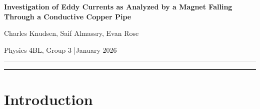 \documentclass[11pt]{article}
\begin{document}

\begin{center}
    {\large\textbf{Investigation of Eddy Currents as Analyzed by a Magnet Falling Through a Conductive Copper Pipe}}

    \vspace{0.5em}
    Charles Knudsen, Saif Almassry, Evan Rose

    \vspace{0.2em}
    {\small Physics 4BL, Group 3 \quad|\quad January 2026}
\end{center}

\medskip
\hrule
\medskip

\begin{abstract}
This experiment investigated the effect of eddy currents on a neodymium magnet falling through
a conductive copper pipe. Faraday's Law of Induction and Lenz's Law predicted that the
changing magnetic flux from the falling magnet would induce circulating currents in the copper
pipe walls, generating an opposing magnetic field and a velocity-dependent braking force. We
tested this by dropping the magnet through a clear plastic tube as a free-fall control and through
a copper pipe of the same length, recording trigger times at five handmade induction coils using
an ESP32 microcontroller. The average velocity through the plastic tube was
$2.23 \pm 0.06$~m/s, consistent with the kinematic free-fall prediction of $2.19$~m/s to within
$1.6\%$. Through the copper pipe, the magnet reached a terminal velocity of
$v_t = 0.109 \pm 0.012$~m/s --- roughly 20 times slower --- corresponding to a magnetic drag
coefficient of $b = 2.07 \pm 0.24$~kg/s. These results supported our hypothesis that eddy
currents in the copper pipe generated a drag force sufficient to drive the magnet to a well-defined
terminal velocity.
\end{abstract}

\medskip
\hrule
\medskip

\section{Introduction}
\label{sec:intro}
\end{document}
